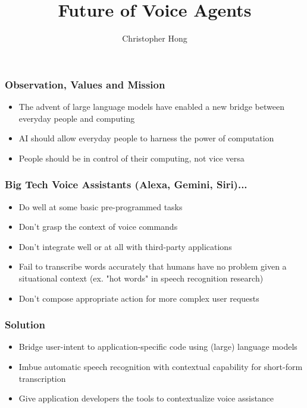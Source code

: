 \documentclass{beamer}
\title{Future of Voice Agents}
\author{Christopher Hong}
\newcommand{\cmark}{\ding{51}}%
\newcommand{\xmark}{\ding{55}}%
\newcommand{\done}{\item[\cmark]}
\newcommand{\crossed}{\item[\xmark]}
\begin{document}
\frame{\titlepage}

\begin{frame}
\frametitle{Observation, Values and Mission}
\begin{itemize}
    \item The advent of large language models have enabled a new bridge between everyday people and computing
    \item AI should allow everyday people to harness the power of computation
    \item People should be in control of their computing, not vice versa
\end{itemize}
\end{frame}

\begin{frame}
\frametitle{Big Tech Voice Assistants (Alexa, Gemini, Siri)...}
\begin{itemize}
    \done Do well at some basic pre-programmed tasks
    \crossed Don't grasp the context of voice commands
    \crossed Don't integrate well or at all with third-party applications
    \crossed Fail to transcribe words accurately that humans have no problem given a situational context (ex. "hot words" in speech recognition research)
    \crossed Don't compose appropriate action for more complex user requests
\end{itemize}
\end{frame}

\begin{frame}
\frametitle{Solution}
\begin{itemize}
    \item Bridge user-intent to application-specific code using (large) language models
    \item Imbue automatic speech recognition with contextual capability for short-form transcription
    \item Give application developers the tools to contextualize voice assistance
\end{itemize}
\end{frame}
\end{document}
